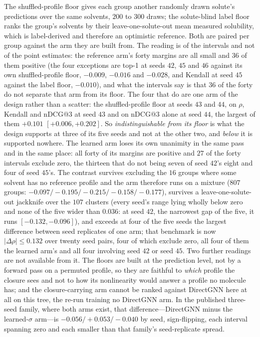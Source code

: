 The shuffled-profile floor gives each group another randomly drawn solute's predictions over the
same solvents, $200$ to $300$ draws; the solute-blind label floor ranks the group's solvents by
their leave-one-solute-out mean measured solubility, which is label-derived and therefore an
optimistic reference. Both are paired per group against the arm they are built from. The reading is
of the intervals and not of the point estimates: the reference arm's forty margins are all
small and $36$ of them positive (the four exceptions are top-1 at seeds $42$, $45$ and $46$ against
its own shuffled-profile floor, $-0.009$, $-0.016$ and $-0.028$, and Kendall at seed $45$ against the
label floor, $-0.010$), and what the intervals say is that $36$ of the forty do not separate that arm
from its floor. The four that do are one arm of the design rather than a scatter: the shuffled-profile
floor at seeds $43$ and $44$, on $\rho$, Kendall and nDCG@3 at seed $43$ and on nDCG@3 alone at seed
$44$, the largest of them $+0.101$ $[+0.006,+0.202]$. So \emph{indistinguishable from its floor} is
what the design supports at three of its five seeds and not at the other two, and \emph{below} it is
supported nowhere.
The learned arm loses its own unanimity in the same pass and in the same place: all forty of its
margins are positive and $27$ of the forty intervals exclude zero, the thirteen that do not being
seven of seed $42$'s eight and four of seed $45$'s.
The contrast survives excluding the $16$ groups where some solvent has no
reference profile and the arm therefore runs on a mixture ($807$ groups:
$-0.097/{-}0.195/{-}0.215/{-}0.158/{-}0.177$),
survives a leave-one-solute-out jackknife over the $107$ clusters (every seed's range lying wholly
below zero and none of the five wider than $0.036$: at seed $42$, the narrowest gap of the five,
it runs $[-0.132,-0.096]$), and exceeds at four of
the five seeds the largest difference between seed replicates of one arm; that benchmark is now
$|\Delta\rho|\le0.132$ over twenty seed pairs, four of which exclude zero, all four of them the
learned arm's and all four involving seed $42$ or seed $45$. Two further readings are not available
from it. The floors are built at the prediction
level, not by a forward pass on a permuted profile, so they are faithful to \emph{which} profile
the closure sees and not to how its nonlinearity would answer a profile no molecule has; and the
closure-carrying arm cannot be ranked against DirectGNN here at all on this tree, the re-run
training no DirectGNN arm. In the published three-seed family, where both arms exist, that
difference---DirectGNN minus the learned-$\sigma$ arm---is $-0.056/{+}0.053/{-}0.040$ by seed,
sign-flipping, each interval spanning zero and each smaller than that family's seed-replicate
spread.

